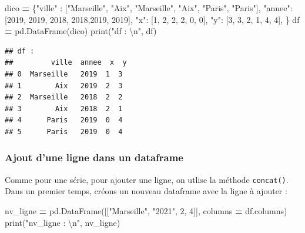 \documentclass[
  12pt,
]{book}
\newenvironment{Shaded}{\begin{snugshade}}{\end{snugshade}}
\newcommand{\BuiltInTok}[1]{#1}
\newcommand{\CharTok}[1]{\textcolor[rgb]{0.31,0.60,0.02}{#1}}
\newcommand{\DecValTok}[1]{\textcolor[rgb]{0.00,0.00,0.81}{#1}}
\newcommand{\NormalTok}[1]{#1}
\newcommand{\OperatorTok}[1]{\textcolor[rgb]{0.81,0.36,0.00}{\textbf{#1}}}
\newcommand{\StringTok}[1]{\textcolor[rgb]{0.31,0.60,0.02}{#1}}
\numberwithin{equation}{section}
\numberwithin{countremarque}{section}
\begin{document}
\begin{Shaded}
\begin{Highlighting}[]
\NormalTok{dico }\OperatorTok{=}\NormalTok{ \{}\StringTok{"ville"}\NormalTok{ : [}\StringTok{"Marseille"}\NormalTok{, }\StringTok{"Aix"}\NormalTok{,}
                   \StringTok{"Marseille"}\NormalTok{, }\StringTok{"Aix"}\NormalTok{, }\StringTok{"Paris"}\NormalTok{, }\StringTok{"Paris"}\NormalTok{],}
        \StringTok{"annee"}\NormalTok{: [}\DecValTok{2019}\NormalTok{, }\DecValTok{2019}\NormalTok{, }\DecValTok{2018}\NormalTok{, }\DecValTok{2018}\NormalTok{,}\DecValTok{2019}\NormalTok{, }\DecValTok{2019}\NormalTok{],}
        \StringTok{"x"}\NormalTok{: [}\DecValTok{1}\NormalTok{, }\DecValTok{2}\NormalTok{, }\DecValTok{2}\NormalTok{, }\DecValTok{2}\NormalTok{, }\DecValTok{0}\NormalTok{, }\DecValTok{0}\NormalTok{],}
        \StringTok{"y"}\NormalTok{: [}\DecValTok{3}\NormalTok{, }\DecValTok{3}\NormalTok{, }\DecValTok{2}\NormalTok{, }\DecValTok{1}\NormalTok{, }\DecValTok{4}\NormalTok{, }\DecValTok{4}\NormalTok{],}
\NormalTok{       \} }
\NormalTok{df }\OperatorTok{=}\NormalTok{ pd.DataFrame(dico)}
\BuiltInTok{print}\NormalTok{(}\StringTok{"df : }\CharTok{\textbackslash{}n}\StringTok{"}\NormalTok{, df)}
\end{Highlighting}
\end{Shaded}

\begin{lstlisting}
## df : 
##         ville  annee  x  y
## 0  Marseille   2019  1  3
## 1        Aix   2019  2  3
## 2  Marseille   2018  2  2
## 3        Aix   2018  2  1
## 4      Paris   2019  0  4
## 5      Paris   2019  0  4
\end{lstlisting}

\subsubsection{Ajout d'une ligne dans un dataframe}\label{pandas-ajout-ligne-df}

Comme pour une série, pour ajouter une ligne, on utlise la méthode \texttt{concat()}. Dans un premier temps, créons un nouveau dataframe avec la ligne à ajouter :

\begin{Shaded}
\begin{Highlighting}[]
\NormalTok{nv\_ligne }\OperatorTok{=}\NormalTok{ pd.DataFrame([[}\StringTok{"Marseille"}\NormalTok{, }\StringTok{"2021"}\NormalTok{, }\DecValTok{2}\NormalTok{, }\DecValTok{4}\NormalTok{]],}
\NormalTok{                       columns }\OperatorTok{=}\NormalTok{ df.columns)}
\BuiltInTok{print}\NormalTok{(}\StringTok{"nv\_ligne : }\CharTok{\textbackslash{}n}\StringTok{"}\NormalTok{, nv\_ligne)}
\end{Highlighting}
\end{Shaded}
\end{document}
